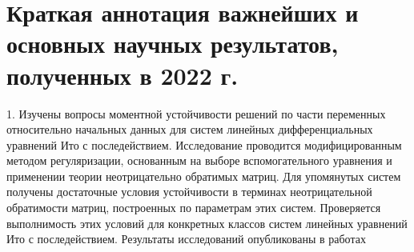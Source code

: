 

% 

\chapter{Краткая аннотация важнейших и основных научных результатов,
полученных в 2022 г.}

1. Изучены вопросы моментной устойчивости решений по части
переменных относительно начальных данных для систем линейных
дифференциальных уравнений Ито с последействием. Исследование
проводится модифицированным методом регуляризации, основанным на
выборе вспомогательного уравнения и применении теории неотрицательно
обратимых матриц. Для упомянутых систем получены достаточные условия
устойчивости в терминах неотрицательной обратимости матриц,
построенных по параметрам этих систем. Проверяется выполнимость этих
условий для конкретных классов систем линейных уравнений Ито с
последействием. Результаты исследований опубликованы в работах 
\smallskip

